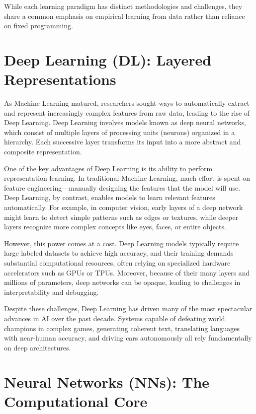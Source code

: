 \documentclass{book}
\begin{document}
While each learning paradigm has distinct methodologies and challenges, they 
share a common emphasis on empirical learning from data rather than reliance on 
fixed programming.

\section{Deep Learning (DL): Layered Representations}

As Machine Learning matured, researchers sought ways to automatically extract 
and represent increasingly complex features from raw data, leading to the rise 
of Deep Learning. Deep Learning involves models known as deep neural networks, 
which consist of multiple layers of processing units (neurons) organized in a 
hierarchy. Each successive layer transforms its input into a more abstract and 
composite representation.

One of the key advantages of Deep Learning is its ability to perform 
representation learning. In traditional Machine Learning, much effort is spent 
on feature engineering—manually designing the features that the model will use. 
Deep Learning, by contrast, enables models to learn relevant features 
automatically. For example, in computer vision, early layers of a deep network 
might learn to detect simple patterns such as edges or textures, while deeper 
layers recognize more complex concepts like eyes, faces, or entire objects.

However, this power comes at a cost. Deep Learning models typically require 
large labeled datasets to achieve high accuracy, and their training demands 
substantial computational resources, often relying on specialized hardware 
accelerators such as GPUs or TPUs. Moreover, because of their many layers and 
millions of parameters, deep networks can be opaque, leading to challenges in 
interpretability and debugging.

Despite these challenges, Deep Learning has driven many of the most spectacular 
advances in AI over the past decade. Systems capable of defeating world 
champions in complex games, generating coherent text, translating languages with
near-human accuracy, and driving cars autonomously all rely fundamentally on 
deep architectures.

\section{Neural Networks (NNs): The Computational Core}
\end{document}
